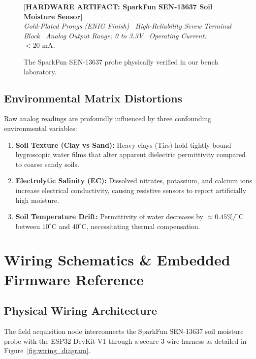 \documentclass[11pt,a4paper,oneside]{report}
\begin{document}
\begin{figure}[h!]
\centering
\begin{tcolorbox}[enhanced,colback=white,colframe=nasablue,width=0.65\linewidth,arc=2mm]
\centering
\textbf{[HARDWARE ARTIFACT: SparkFun SEN-13637 Soil Moisture Sensor]}\\[0.2cm]
\textit{Gold-Plated Prongs (ENIG Finish) \textbar\ High-Reliability Screw Terminal Block \textbar\ Analog Output Range: 0 to 3.3V \textbar\ Operating Current: $< 20\text{ mA}$.}
\end{tcolorbox}
\caption{The SparkFun SEN-13637 probe physically verified in our bench laboratory.}
\label{fig:sparkfun_sensor}
\end{figure}

\section{Environmental Matrix Distortions}
Raw analog readings are profoundly influenced by three confounding environmental variables:
\begin{enumerate}
    \item \textbf{Soil Texture (Clay vs Sand):} Heavy clays (Tirs) hold tightly bound hygroscopic water films that alter apparent dielectric permittivity compared to coarse sandy soils.
    \item \textbf{Electrolytic Salinity (EC):} Dissolved nitrates, potassium, and calcium ions increase electrical conductivity, causing resistive sensors to report artificially high moisture.
    \item \textbf{Soil Temperature Drift:} Permittivity of water decreases by $\approx 0.45\% / ^\circ\text{C}$ between $10^\circ\text{C}$ and $40^\circ\text{C}$, necessitating thermal compensation.
\end{enumerate}

\chapter{Wiring Schematics \& Embedded Firmware Reference}

\section{Physical Wiring Architecture}
The field acquisition node interconnects the SparkFun SEN-13637 soil moisture probe with the ESP32 DevKit V1 through a secure 3-wire harness as detailed in Figure~\ref{fig:wiring_diagram}.
\end{document}
